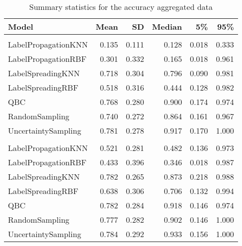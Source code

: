 \begin{table}[!h]

\caption{\label{tab:summarystatisticstable}Summary statistics for the accuracy aggregated data}
\centering
\begin{tabular}[t]{lrrrrr}
\toprule
Model & Mean & SD & Median & 5\% & 95\%\\
\midrule
\addlinespace[0.3em]
\multicolumn{6}{l}{\textbf{10\% missing labels}}\\
\hspace{1em}LabelPropagationKNN & 0.135 & 0.111 & 0.128 & 0.018 & 0.333\\
\hspace{1em}LabelPropagationRBF & 0.301 & 0.332 & 0.165 & 0.018 & 0.961\\
\hspace{1em}LabelSpreadingKNN & 0.718 & 0.304 & 0.796 & 0.090 & 0.981\\
\hspace{1em}LabelSpreadingRBF & 0.518 & 0.316 & 0.444 & 0.128 & 0.982\\
\hspace{1em}QBC & 0.768 & 0.280 & 0.900 & 0.174 & 0.974\\
\hspace{1em}RandomSampling & 0.740 & 0.272 & 0.864 & 0.161 & 0.967\\
\hspace{1em}UncertaintySampling & 0.781 & 0.278 & 0.917 & 0.170 & 1.000\\
\addlinespace[0.3em]
\multicolumn{6}{l}{\textbf{50\% missing labels}}\\
\hspace{1em}LabelPropagationKNN & 0.521 & 0.281 & 0.482 & 0.136 & 0.973\\
\hspace{1em}LabelPropagationRBF & 0.433 & 0.396 & 0.346 & 0.018 & 0.987\\
\hspace{1em}LabelSpreadingKNN & 0.782 & 0.265 & 0.873 & 0.218 & 0.988\\
\hspace{1em}LabelSpreadingRBF & 0.638 & 0.306 & 0.706 & 0.132 & 0.994\\
\hspace{1em}QBC & 0.782 & 0.284 & 0.918 & 0.146 & 0.974\\
\hspace{1em}RandomSampling & 0.777 & 0.282 & 0.902 & 0.146 & 1.000\\
\hspace{1em}UncertaintySampling & 0.784 & 0.292 & 0.933 & 0.156 & 1.000\\
\bottomrule
\end{tabular}
\end{table}
